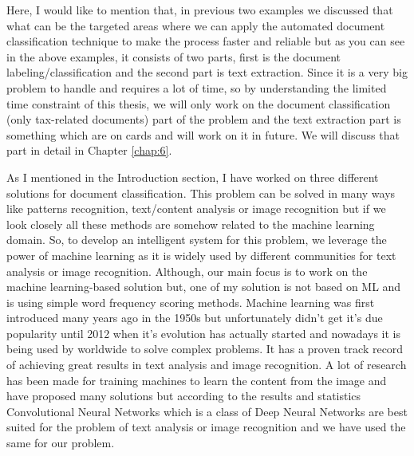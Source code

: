 \newline
\par
Here, I would like to mention that, in previous two examples we discussed that what can be the targeted areas where we can apply the automated document classification technique to make the process faster and reliable but as you can see in the above examples, it consists of two parts, first is the document labeling/classification and the second part is text extraction. Since it is a very big problem to handle and requires a lot of time, so by understanding the limited time constraint of this thesis, we will only work on the document classification (only tax-related documents) part of the problem and the text extraction part is something which are on cards and will work on it in future. We will discuss that part in detail in Chapter \ref{chap:6}.
\newline
\par
As I mentioned in the Introduction section, I have worked on three different solutions for document classification. This problem can be solved in many ways like patterns recognition, text/content analysis or image recognition but if we look closely all these methods are somehow related to the machine learning domain. So, to develop an intelligent system for this problem, we leverage the power of machine learning as it is widely used by different communities for text analysis or image recognition. Although, our main focus is to work on the machine learning-based solution but, one of my solution is not based on ML and is using simple word frequency scoring methods. Machine learning was first introduced many years ago in the 1950s but unfortunately didn't get it’s due popularity until 2012 when it’s evolution has actually started and nowadays it is being used by worldwide to solve complex problems. It has a proven track record of achieving great results in text analysis and image recognition. A lot of research has been made for training machines to learn the content from the image and have proposed many solutions but according to the results and statistics Convolutional Neural Networks \cite{url1} \cite{1708.03273}  which is a class of Deep Neural Networks \cite{Krizhevsky} are best suited for the problem of text analysis or image recognition and we have used the same for our problem.
\newline
\par

